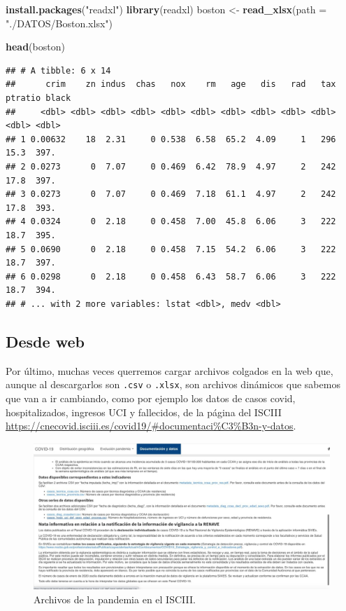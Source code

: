 \documentclass[11pt,]{book}
\newenvironment{Shaded}{\begin{snugshade}}{\end{snugshade}}
\newcommand{\DataTypeTok}[1]{\textcolor[rgb]{0.27,0.27,0.27}{#1}}
\newcommand{\KeywordTok}[1]{\textcolor[rgb]{0.27,0.27,0.27}{\textbf{#1}}}
\newcommand{\NormalTok}[1]{#1}
\newcommand{\StringTok}[1]{\textcolor[rgb]{0.5,0.5,0.5}{#1}}
\begin{document}
\begin{Shaded}
\begin{Highlighting}[]
\KeywordTok{install.packages}\NormalTok{(}\StringTok{"readxl"}\NormalTok{)}
\KeywordTok{library}\NormalTok{(readxl)}
\NormalTok{boston <-}\StringTok{ }\KeywordTok{read_xlsx}\NormalTok{(}\DataTypeTok{path =} \StringTok{"./DATOS/Boston.xlsx"}\NormalTok{)}
\end{Highlighting}
\end{Shaded}

\begin{Shaded}
\begin{Highlighting}[]
\KeywordTok{head}\NormalTok{(boston)}
\end{Highlighting}
\end{Shaded}

\begin{verbatim}
## # A tibble: 6 x 14
##      crim    zn indus  chas   nox    rm   age   dis   rad   tax ptratio black
##     <dbl> <dbl> <dbl> <dbl> <dbl> <dbl> <dbl> <dbl> <dbl> <dbl>   <dbl> <dbl>
## 1 0.00632    18  2.31     0 0.538  6.58  65.2  4.09     1   296    15.3  397.
## 2 0.0273      0  7.07     0 0.469  6.42  78.9  4.97     2   242    17.8  397.
## 3 0.0273      0  7.07     0 0.469  7.18  61.1  4.97     2   242    17.8  393.
## 4 0.0324      0  2.18     0 0.458  7.00  45.8  6.06     3   222    18.7  395.
## 5 0.0690      0  2.18     0 0.458  7.15  54.2  6.06     3   222    18.7  397.
## 6 0.0298      0  2.18     0 0.458  6.43  58.7  6.06     3   222    18.7  394.
## # ... with 2 more variables: lstat <dbl>, medv <dbl>
\end{verbatim}

\hypertarget{desde-web}{%
\subsection{Desde web}\label{desde-web}}

Por último, muchas veces querremos cargar archivos colgados en la web que, aunque al descargarlos son \texttt{.csv} o \texttt{.xlsx}, son archivos dinámicos que sabemos que van a ir cambiando, como por ejemplo los datos de casos covid, hospitalizados, ingresos UCI y fallecidos, de la página del ISCIII \url{https://cnecovid.isciii.es/covid19/\#documentaci\%C3\%B3n-y-datos}.

\begin{figure}

{\centering \includegraphics[width=0.75\linewidth]{./img/ISCIII} 

}

\caption{Archivos de la pandemia en el ISCIII.}\label{fig:ISCIII}
\end{figure}
\end{document}
